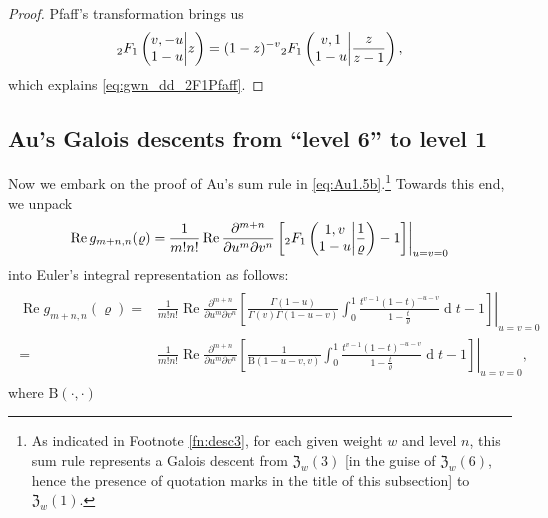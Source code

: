 \documentclass[final,notitlepage,12pt,reqno]{amsart}
\DeclareMathOperator{\D}{d}
\DeclareMathOperator{\R}{Re}
\theoremstyle{plain}
\theoremstyle{definition}
\numberwithin{equation}{section}
\begin{document}
\begin{proof}
Pfaff's transformation \cite[(2.2.6)]{AAR}  brings us\begin{align}
{_2}F_1\left(\begin{array}{@{}c@{}}
v,-u \\
1-u \\
\end{array}\middle| z\right)=(1-z)^{-v}{_2}F_1\left(\begin{array}{@{}c@{}}
v,1 \\
1-u \\
\end{array}\middle| \frac{z}{z-1}\right),
\end{align} which explains \eqref{eq:gwn_dd_2F1Pfaff}.
\end{proof}


 
\subsection{Au's Galois descents from ``level 6'' to level 1\label{subsec:desc3}}
Now we embark on the proof of  Au's  sum rule in \eqref{eq:Au1.5b}.\footnote{As indicated in Footnote \ref{fn:desc3}, for each given weight $ w$ and level $n$, this sum rule represents a Galois descent from  $ \mathfrak Z_w(3)$ [in the guise of $ \mathfrak Z_w(6)$, hence the presence of quotation marks in the title of this subsection] to   $ \mathfrak Z_w(1)$. }  Towards this end, we unpack\begin{align}\R
g_{m+n,n}(\varrho)=\left.\!\frac1{m!n!}\R\frac{\partial^{m+n}}{\partial u^{m}\partial v^n}\left[ {_2}F_1\left(\begin{array}{@{}c@{}}
1,v \\
1-u \\
\end{array}\middle| \frac{1}{\varrho}\right) -1\right]\right|_{u=v=0}
\end{align}into Euler's integral representation \cite[Theorem 2.2.1]{AAR}
as follows:\begin{align}
\begin{split}\R
g_{m+n,n}(\varrho)={}&\frac1{m!n!}\left.\!\R\frac{\partial^{m+n}}{\partial u^{m}\partial v^n}\left[ \frac{\Gamma (1-u) }{\Gamma (v) \Gamma (1-u-v)} \int_0^1 \frac{t^{v-1} (1-t)^{-u-v}}{1-\frac{t }{\varrho}} \D t-1\right]\right|_{u=v=0}\\={}&\frac1{m!n!}\left.\!\R\frac{\partial^{m+n}}{\partial u^{m}\partial v^n}\left[ \frac{1 }{\mathrm B(1-u-v,v)} \int_0^1 \frac{t^{v-1} (1-t)^{-u-v}}{1-\frac{t }{\varrho}} \D t-1\right]\right|_{u=v=0},
\end{split}
\end{align}where $ \mathrm B(\cdot,\cdot)$ 
\end{document}
